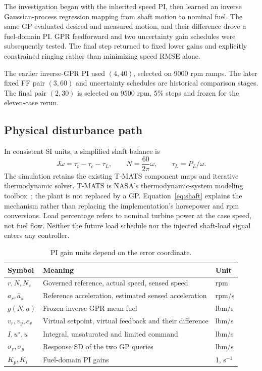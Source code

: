 \documentclass[11pt,a4paper]{article}
\begin{document}
The investigation began with the inherited speed PI, then learned an inverse Gaussian-process regression mapping from shaft motion to nominal fuel. The same GP evaluated desired and measured motion, and their difference drove a fuel-domain PI. GPR feedforward and two uncertainty gain schedules were subsequently tested. The final step returned to fixed lower gains and explicitly constrained ringing rather than minimizing speed RMSE alone.

The earlier inverse-GPR PI used $(4,40)$, selected on 9000 rpm ramps. The later fixed FF pair $(3,60)$ and uncertainty schedules are historical comparison stages. The final pair $(2,30)$ is selected on 9500 rpm, 5\% steps and frozen for the eleven-case rerun.

\subsection{Physical disturbance path}
In consistent SI units, a simplified shaft balance is
\begin{equation}
J\dot\omega=\tau_t-\tau_c-\tau_L,\qquad N=\frac{60}{2\pi}\omega,\qquad \tau_L=P_L/\omega.
\label{eq:shaft}
\end{equation}
The simulation retains the existing T-MATS component maps and iterative thermodynamic solver. T-MATS is NASA's thermodynamic-system modeling toolbox~\cite{tmats}; the plant is not replaced by a GP. Equation~\eqref{eq:shaft} explains the mechanism rather than replacing the implementation's horsepower and rpm conversions. Load percentage refers to nominal turbine power at the case speed, not fuel flow. Neither the future load schedule nor the injected shaft-load signal enters any controller.

\begin{table}[H]\centering\small
\begin{tabularx}{\linewidth}{@{}lXl@{}}\toprule Symbol & Meaning & Unit\\\midrule
$r,N,N_s$ & Governed reference, actual speed, sensed speed & rpm\\
$a_r,\hat a_s$ & Reference acceleration, estimated sensed acceleration & rpm/s\\
$g(N,a)$ & Frozen inverse-GPR mean fuel & lbm/s\\
$v_r,v_y,e_v$ & Virtual setpoint, virtual feedback and their difference & lbm/s\\
$I,u^\star,u$ & Integral, unsaturated and limited command & lbm/s\\
$\sigma_r,\sigma_y$ & Response SD of the two GP queries & lbm/s\\
$K_p,K_i$ & Fuel-domain PI gains & 1, s$^{-1}$\\\bottomrule
\end{tabularx}\caption{PI gain units depend on the error coordinate.}\end{table}
\end{document}
